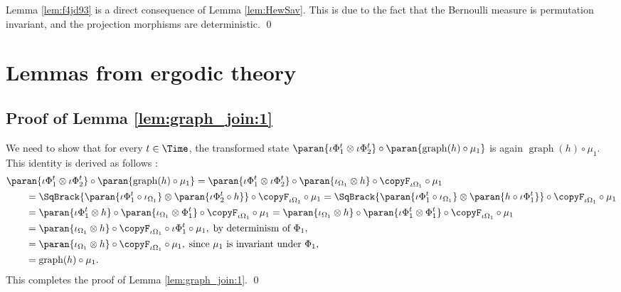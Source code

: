 \documentclass[12pt,oneside,pb-diagram]{article}
\DeclareMathOperator{\graph}{graph}
\begin{document}
Lemma \ref{lem:f4jd93} is a direct consequence of Lemma \ref{lem:HewSav}. This is due to the fact that the Bernoulli measure is permutation invariant, and the projection morphisms are deterministic. \qed

\section{Lemmas from ergodic theory} \label{sec:app:erg}
\subsection{Proof of Lemma \ref{lem:graph_join:1}} \label{sec:proof:graph_join:1}

We need to show that for every $t\in \Time$, the transformed state $\paran{ \iota \Phi_1^t \otimes \iota \Phi_2^t } \circ \paran{  \graph(h) \circ \mu_1 }$ is again $\graph(h) \circ \mu_1$. This identity is derived as follows :
%
\[\begin{split}
	& \paran{ \iota \Phi_1^t \otimes \iota \Phi_2^t } \circ \paran{  \graph(h) \circ \mu_1 } = \paran{ \iota \Phi_1^t \otimes \iota \Phi_2^t } \circ \paran{ \iota_{\Omega_1} \otimes h } \circ \copyF_{\iota \Omega_1} \circ \mu_1 \\
	& \quad \quad = \SqBrack{ \paran{\iota \Phi_1^t \circ \iota_{\Omega_1}} \otimes \paran{\iota \Phi_2^t \circ h} } \circ \copyF_{\iota \Omega_1} \circ \mu_1 
	= \SqBrack{ \paran{\iota \Phi_1^t \circ \iota_{\Omega_1}} \otimes \paran{h\circ \iota \Phi_1^t} } \circ \copyF_{\iota \Omega_1} \circ \mu_1  \\
	& \quad \quad = \paran{ \iota \Phi_1^t \otimes h } \circ \paran{\iota_{\Omega_1} \otimes \Phi_1^t} \circ \copyF_{\iota \Omega_1} \circ \mu_1 = \paran{\iota_{\Omega_1} \otimes h } \circ \paran{ \iota \Phi_1^t \otimes \Phi_1^t} \circ \copyF_{\iota \Omega_1} \circ \mu_1 \\
	& \quad \quad = \paran{\iota_{\Omega_1} \otimes h } \circ \copyF_{\iota \Omega_1} \circ \iota \Phi_1^t \circ \mu_1 ,\; \mbox{by determinism of } \Phi_1 , \\
	& \quad \quad = \paran{\iota_{\Omega_1} \otimes h } \circ \copyF_{\iota \Omega_1} \circ \mu_1 ,\; \mbox{since } \mu_1 \mbox{ is invariant under } \Phi_1 , \\
	& \quad \quad = \graph(h) \circ \mu_1 .
\end{split}\]
%
This completes the proof of Lemma \ref{lem:graph_join:1}. \qed
\end{document}
